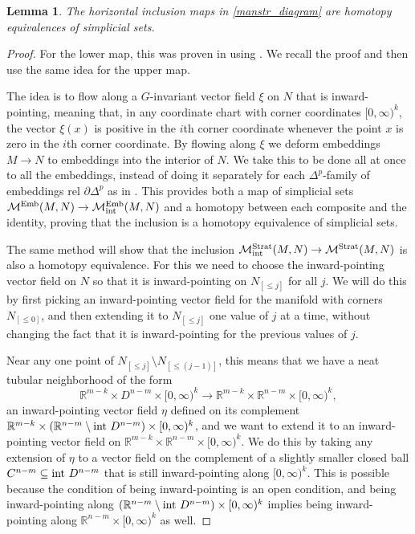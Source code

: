 \documentclass[11pt]{amsart}
\newtheorem{lem}{Lemma}[section]
\theoremstyle{definition}
\numberwithin{equation}{section}
\numberwithin{figure}{section}
\newcommand{\R}{\mathbb R}
\newcommand{\mc}{\mathcal}
\newcommand{\Man}{\mc M^\mathrm{Emb}}
\newcommand{\Manstr}{\mc M^\mathrm{Strat}}
\begin{document}
\begin{lem}\label{manstr_interior}
	The horizontal inclusion maps in \eqref{manstr_diagram} are homotopy equivalences of simplicial sets.
\end{lem}

\begin{proof}
	For the lower map, this was proven in \cite[Thm 6.13]{GIMM1} using \cite[Prop 2.46]{GIMM1}. We recall the proof and then use the same idea for the upper map.
	
	The idea is to flow along a $G$-invariant vector field $\xi$ on $N$ that is inward-pointing, meaning that, in any coordinate chart with corner coordinates $[0,\infty)^k$, the vector $\xi(x)$ is positive in the $i$th corner coordinate whenever the point $x$ is zero in the $i$th corner coordinate. By flowing along $\xi$ we deform embeddings $M \to N$ to embeddings into the interior of $N$. We take this to be done all at once to all the embeddings, instead of doing it separately for each $\Delta^p$-family of embeddings rel $\partial \Delta^p$ as in  \cite[Thm 6.13]{GIMM1}. This provides both a map of simplicial sets $\Man(M,N) \to \Man_{\textup{int}}(M,N)$ and a homotopy between each composite and the identity, proving that the inclusion is a homotopy equivalence of simplicial sets.
	
	 The same method will show that the inclusion $\Manstr_{\textup{int}}(M,N) \to \Manstr(M,N)$ is also a homotopy equivalence. For this we need to choose the inward-pointing vector field on $N$ so that it is inward-pointing on $N_{[\leq j]}$ for all $j$. We will do this by first picking an inward-pointing vector field for the manifold with corners $N_{[\leq 0]}$, and then extending it to $N_{[\leq j]}$ one value of $j$ at a time, without changing the fact that it is inward-pointing for the previous values of $j$.
	
	Near any one point of $N_{[\leq j]} \setminus N_{[\leq (j-1)]}$, this means that we have a neat tubular neighborhood of the form
\[  \R^{m-k} \times D^{n-m} \times [0,\infty)^k \to  \R^{m-k} \times \R^{n-m} \times [0,\infty)^k, \]
	an inward-pointing vector field $\eta$ defined on its complement $\R^{m-k} \times (\R^{n-m} \setminus \textup{int }D^{n-m}) \times [0,\infty)^k$, and we want to extend it to an inward-pointing vector field on $\R^{m-k} \times \R^{n-m} \times [0,\infty)^k$. We do this by taking any extension of $\eta$ to a vector field on the complement of a slightly smaller closed ball $C^{n-m} \subseteq \textup{int }D^{n-m}$ that is still inward-pointing along $[0,\infty)^k$. This is possible because the condition of being inward-pointing is an open condition, and being inward-pointing along $(\R^{n-m} \setminus \textup{int }D^{n-m}) \times [0,\infty)^k$ implies being inward-pointing along $\R^{n-m} \times [0,\infty)^k$ as well.
	

\end{proof}
\end{document}
